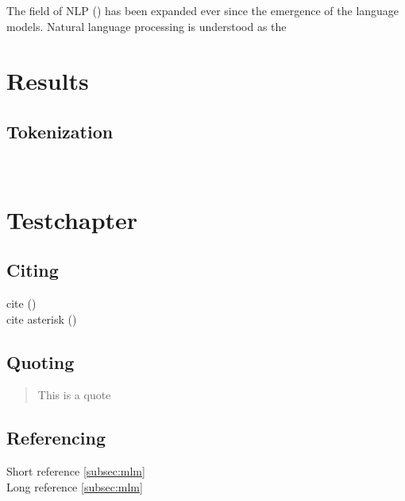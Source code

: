 \documentclass[english]{ttlab-qualify}
\begin{document}
    The field of NLP  (\cite{METZLER2016}) has been expanded ever since the emergence of the language models.
    Natural language processing is understood as the
    \\

    \chapter{Results}
    \label{ch:results}

    \section{Tokenization}

    \
    \chapter{\latex Testchapter}
    \section{Citing}
    cite (\cite{METZLER2016})\\
    cite asterisk (\cite*{METZLER2016})\\

    \section{Quoting}
    \begin{quote}
        This is a quote
    \end{quote}

    \section{Referencing}
    Short reference \ref{subsec:mlm}\\
    Long reference \autoref{subsec:mlm}\\

    \appendix
    \printbibliography
\end{document}
